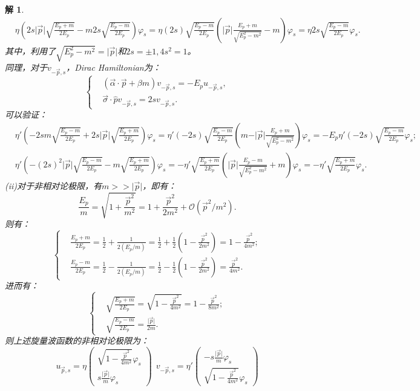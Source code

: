 \documentclass[UTF8,10pt,a4paper]{article}
\theoremstyle{Problem}%
\theoremstyle{Solution}%
\newtheorem*{sol}{解}%
\begin{document}
\begin{sol}
\[\begin{aligned}
    &\eta \left( 2s \vert \vec{p} \vert \sqrt{\frac{E_p+m}{2E_p}} -m 2s\sqrt{\frac{E_p-m}{2E_p}} \right) \varphi_s = \eta(2s) \sqrt{\frac{E_p-m}{2E_p}} \left( \vert \vec{p} \vert \frac{E_p+m}{\sqrt{E_p^2-m^2}} - m \right)\varphi_s = \eta 2s \sqrt{\frac{E_p-m}{2E_p}} \varphi_s.
    \end{aligned}
\]
其中，利用了$\sqrt{E_p^2 - m^2} = \vert \vec{p} \vert$和$2s = \pm 1,4s^2 = 1$。 \\
同理，对于$v_{-\vec{p},s}$，Dirac Hamiltonian为：
\[
    \left\{ \begin{aligned}
    &(\vec{\alpha} \cdot \vec{p} + \beta m) v_{-\vec{p},s} = -E_p u_{-\vec{p},s}, \\
    &\vec{\sigma} \cdot \hat{p} v_{-\vec{p},s} = 2s v_{-\vec{p},s}.
    \end{aligned} \right.
\]
可以验证：
\[
    \begin{aligned}
    &\eta' \left( -2sm\sqrt{\frac{E_p-m}{2E_p}} + 2s \vert \vec{p} \vert \sqrt{\frac{E_p+m}{2E_p}} \right)\varphi_s = \eta' (-2s) \sqrt{\frac{E_p-m}{2E_p}} \left( m - \vert \vec{p} \vert \frac{E_p+m}{\sqrt{E_p^2 - m^2}} \right)\varphi_s = -E_p \eta' (-2s) \sqrt{\frac{E_p-m}{2E_p}} \varphi_s; \\
    &\eta' \left( -(2s)^2\vert \vec{p} \vert \sqrt{\frac{E_p - m}{2E_p}} - m\sqrt{\frac{E_p+m}{2E_p}} \right)\varphi_s = -\eta' \sqrt{\frac{E_p+m}{2E_p}} \left( \vert \vec{p} \vert \frac{E_p-m}{\sqrt{E_p^2-m^2}} + m \right) \varphi_s = -\eta' \sqrt{\frac{E_p+m}{2E_p}} \varphi_s.
    \end{aligned}
\]
(ii)对于非相对论极限，有$m >> \vert \vec{p} \vert$，即有：
\[
    \frac{E_p}{m} = \sqrt{1 + \frac{\vec{p}^2}{m^2}} = 1 + \frac{\vec{p}^2}{2m^2} + \mathcal{O}(\vec{p}^2/m^2).
\]
则有：
\[
    \left\{\begin{aligned}
    &\frac{E_p+m}{2E_p} = \frac{1}{2} + \frac{1}{2(E_p/m)} = \frac{1}{2} + \frac{1}{2}\left( 1 - \frac{\vec{p}^2}{2m^2} \right) = 1 - \frac{\vec{p}^2}{4m^2}; \\
    &\frac{E_p-m}{2E_p} = \frac{1}{2} - \frac{1}{2(E_p/m)} = \frac{1}{2} - \frac{1}{2}\left( 1 - \frac{\vec{p}^2}{2m^2} \right) = \frac{\vec{p}^2}{4m^2}.
    \end{aligned}\right.
\]
进而有：
\[
    \left\{\begin{aligned}
    &\sqrt{\frac{E_p+m}{2E_p}} = \sqrt{1 - \frac{\vec{p}^2}{4m^2}} = 1 - \frac{\vec{p}^2}{8m^2}; \\
    &\sqrt{\frac{E_p-m}{2E_p}} = \frac{\vert \vec{p} \vert}{2m}.
    \end{aligned}\right.
\]
则上述旋量波函数的非相对论极限为：
\[
    u_{\vec{p},s} = \eta \begin{pmatrix}
        \sqrt{1 - \frac{\vec{p}^2}{4m^2}} \varphi_s \\
        s\frac{\vert \vec{p} \vert}{m}\varphi_s
    \end{pmatrix}
    ~~
    v_{-\vec{p},s} = \eta' \begin{pmatrix}
        -s\frac{\vert \vec{p} \vert}{m} \varphi_s \\
        \sqrt{1 - \frac{\vec{p}^2}{4m^2}} \varphi_s
    \end{pmatrix}
\]
\end{sol}
\end{document}
